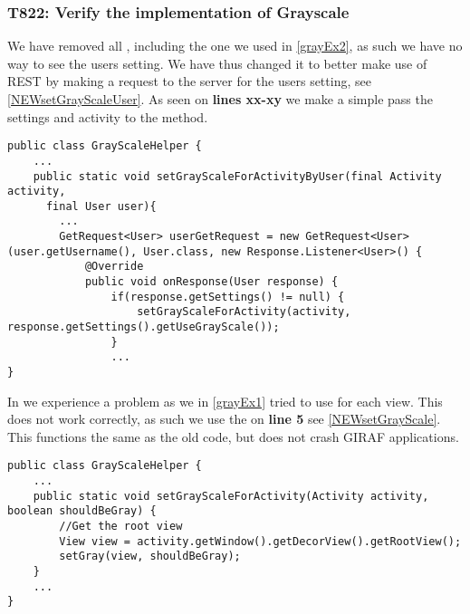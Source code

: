 \subsubsection{T822: Verify the implementation of Grayscale}
We have removed all , including the one we used in
\autoref{grayEx2}, as such we have no way to see the users setting. We have thus
changed it to better make use of REST by making a request to the server for the
users setting, see \autoref{NEWsetGrayScaleUser}. As seen on \textbf{lines
xx-xy} we make a simple  pass the settings and activity to the
 method.\nl

\begin{minipage}[H]{\linewidth}
\begin{lstlisting}[caption = Finds the grayscale setting for each user, label =
NEWsetGrayScaleUser] 
public class GrayScaleHelper {
	...
	public static void setGrayScaleForActivityByUser(final Activity activity, 
	  final User user){
		...
		GetRequest<User> userGetRequest = new GetRequest<User>(user.getUsername(), User.class, new Response.Listener<User>() {
            @Override
            public void onResponse(User response) {
           		if(response.getSettings() != null) {
               		setGrayScaleForActivity(activity, response.getSettings().getUseGrayScale());
               	}
	 			...
}
\end{lstlisting}
\end{minipage}

In  we experience a problem as we in
\autoref{grayEx1} tried to use  for each view. This does not work
correctly, as such we use the  on \textbf{line
5} see \autoref{NEWsetGrayScale}. This functions the same as the old code, but
does not crash GIRAF applications.

\begin{minipage}[H]{\linewidth}
\begin{lstlisting}[caption = The root View is used instead of all the seperate
views, label = NEWsetGrayScale] public class GrayScaleHelper {
	...
    public static void setGrayScaleForActivity(Activity activity, boolean shouldBeGray) {
        //Get the root view
        View view = activity.getWindow().getDecorView().getRootView();
        setGray(view, shouldBeGray);
    }
    ...
}
\end{lstlisting}
\end{minipage}

